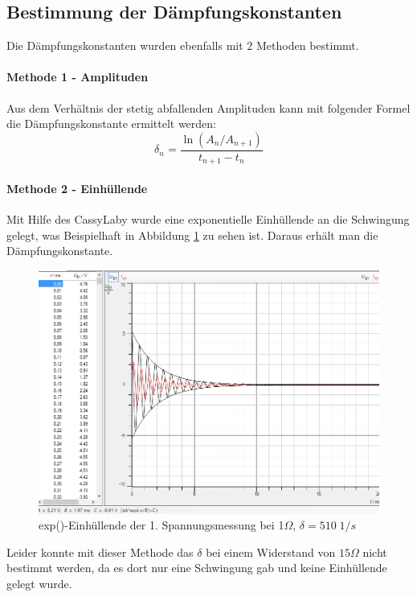\documentclass[a4paper, 11pt]{article}
\begin{document}
\subsection{Bestimmung der Dämpfungskonstanten}
Die Dämpfungskonstanten wurden ebenfalls mit 2 Methoden bestimmt.
\paragraph{Methode 1 - Amplituden}
Aus dem Verhältnis der stetig abfallenden Amplituden kann mit folgender Formel die Dämpfungskonstante ermittelt werden:
\begin{equation}\label{eq:delta}
\delta_n = \frac{\ln \left(A_n/A_{n+1}\right)}{t_{n+1}-t_n}
\end{equation}

\paragraph{Methode 2 - Einhüllende}
Mit Hilfe des CassyLaby wurde eine exponentielle Einhüllende an die Schwingung gelegt, was Beispielhaft in Abbildung \ref{fig:einhuellende} zu sehen ist.
Daraus erhält man die Dämpfungskonstante.
\begin{figure}[H]
	\centering
	\includegraphics[scale=0.5]{EinhuellendemitWerte.png}
	\caption{exp()-Einhüllende der 1. Spannungsmessung bei 1$\Omega$, $\delta = 510 \;1/s$}
	\label{fig:einhuellende}
\end{figure}
Leider konnte mit dieser Methode das $\delta$ bei einem Widerstand von $15\Omega$ nicht bestimmt werden, da es dort nur eine Schwingung gab und keine Einhüllende gelegt wurde.
\end{document}
